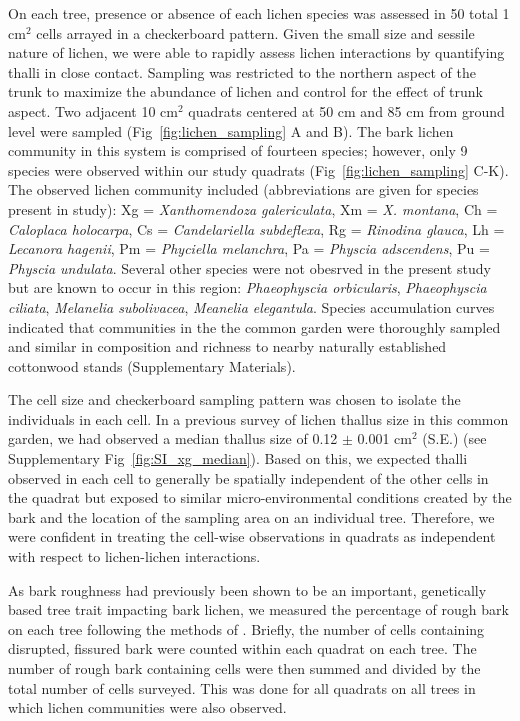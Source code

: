\documentclass[9pt,twocolumn,twoside,lineno]{pnas-new}
\begin{document}
{On each tree, presence or absence of each lichen species was assessed
in 50 total 1 cm$^2$ cells arrayed in a checkerboard pattern. Given
the small size and sessile nature of lichen, we were able to rapidly
assess lichen interactions by quantifying thalli in close
contact. Sampling was restricted to the northern aspect of the trunk
to maximize the abundance of lichen and control for the effect of
trunk aspect. Two adjacent 10 cm$^2$ quadrats centered at 50 cm and 85
cm from ground level were sampled (Fig~\ref{fig:lichen_sampling} A and
B). The bark lichen community in this system is comprised of fourteen
species; however, only 9 species were observed within our study
quadrats (Fig~\ref{fig:lichen_sampling} C-K). The observed lichen
community included (abbreviations are given for species present in
study): Xg = \textit{Xanthomendoza galericulata}, Xm =
\textit{X. montana}, Ch = \textit{Caloplaca holocarpa}, Cs =
\textit{Candelariella subdeflexa}, Rg = \textit{Rinodina glauca}, Lh =
\textit{Lecanora hagenii}, Pm = \textit{Phyciella melanchra}, Pa =
\textit{Physcia adscendens}, Pu = \textit{Physcia undulata}. Several
other species were not obesrved in the present study but are known to
occur in this region:  \textit{Phaeophyscia orbicularis},
\textit{Phaeophyscia ciliata}, \textit{Melanelia subolivacea},
\textit{Meanelia elegantula}. Species accumulation curves indicated
that communities in the the common garden were thoroughly sampled and
similar in composition and richness to nearby naturally established
cottonwood stands (Supplementary Materials).

The cell size and checkerboard sampling pattern was chosen to isolate
the individuals in each cell. In a previous survey of lichen thallus
size in this common garden, we had observed a median thallus size of
0.12 $\pm$ 0.001 cm$^2$ (S.E.) (see Supplementary
Fig~\ref{fig:SI_xg_median}). Based on this, we expected thalli
observed in each cell to generally be spatially independent of the
other cells in the quadrat but exposed to similar micro-environmental
conditions created by the bark and the location of the sampling area
on an individual tree. Therefore, we were confident in treating the
cell-wise observations in quadrats as independent with respect to
lichen-lichen interactions.

As bark roughness had previously been shown to be an important,
genetically based tree trait impacting bark lichen, we measured the
percentage of rough bark on each tree following the methods of
\citep{Lamit2011}. Briefly, the number of cells containing disrupted,
fissured bark were counted within each quadrat on each tree. The
number of rough bark containing cells were then summed and divided by
the total number of cells surveyed. This was done for all quadrats on
all trees in which lichen communities were also observed.


}
\end{document}
